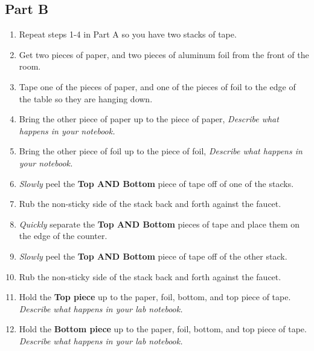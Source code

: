 \documentclass[14pt, fleqn, paper=letter, oneside]{scrartcl}
\begin{document}
\subsection*{Part B}
\begin{enumerate}
\item Repeat steps 1-4 in Part A so you have two stacks of tape.
\item Get two pieces of paper, and two pieces of aluminum foil from the front of the room.
\item Tape one of the pieces of paper, and one of the pieces of foil to the edge of the table so they are hanging down.
\item Bring the other piece of paper up to the piece of paper, \emph{Describe what happens in your notebook.}
\item Bring the other piece of foil up to the piece of foil, \emph{Describe what happens in your notebook.}
\item \emph{Slowly} peel the \textbf{Top AND Bottom} piece of tape off of one of the stacks.
\item Rub the non-sticky side of the stack back and forth against the faucet.
\item \emph{Quickly} separate the \textbf{Top AND Bottom} pieces of tape and place them on the edge of the counter.
\item \emph{Slowly} peel the \textbf{Top AND Bottom} piece of tape off of the other stack.
\item Rub the non-sticky side of the stack back and forth against the faucet.
\item Hold the \textbf{Top piece} up to the paper, foil, bottom, and top piece of tape.  \emph{Describe what happens in your lab notebook.}
\item Hold the \textbf{Bottom piece} up to the paper, foil, bottom, and top piece of tape.  \emph{Describe what happens in your lab notebook.}
\end{enumerate}
\end{document}
